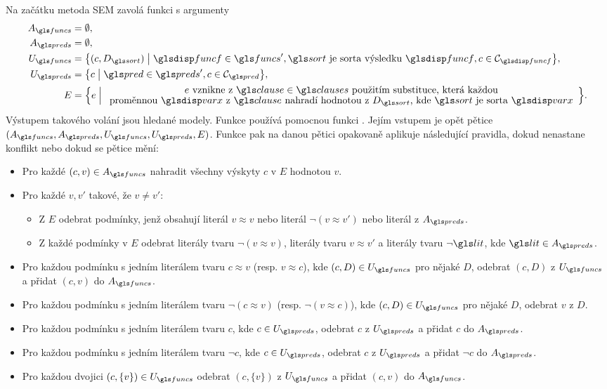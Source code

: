 Na začátku metoda SEM zavolá funkci  s argumenty
\begin{align*}
A_\funcs &= \emptyset, \\
A_\preds &= \emptyset, \\
U_\funcs &=
  \bigl\{ (c, D_\sort) \bigm|
    \func \in \funcs',
    \sort \text{ je sorta výsledku } \func,
    c \in \cells_\func \bigr\}, \\
U_\preds &=
  \bigl\{ c \bigm|
    \pred \in \preds',
    c \in \cells_\pred \bigr\}, \\
E &=
  \Bigl\{ e \Bigm|
    \array{c}
        e \text{ vznikne z $\clause \in \clauses$ použitím substituce,
                která každou} \\[-0.3ex]
      \text{proměnnou $\var$ z $\clause$ nahradí hodnotou z $D_\sort$, kde $\sort$
            je sorta $\var$}
    \endarray
    \Bigr\}.
\end{align*}
Výstupem takového volání jsou hledané modely.
Funkce  používá pomocnou funkci .
Jejím vstupem je opět pětice
$(A_\funcs, A_\preds, U_\funcs, U_\preds, E)$.
Funkce  pak na danou pětici opakovaně
aplikuje ná\-sle\-du\-jící pravidla, dokud nenastane konflikt nebo
dokud se pětice mění:
\begin{itemize}
\item Pro každé $(c, v) \in A_\funcs$ nahradit všechny výskyty $c$ v $E$
  hodnotou $v$.
\item Pro každé $v, v'$ takové, že $v \neq v'$:
  \begin{itemize}
  \item Z $E$ odebrat podmínky, jenž obsahují literál $v \approx v$
    nebo literál $\neg (v \approx v')$ nebo literál z $A_\preds$.
  \item Z každé podmínky v $E$ odebrat literály tvaru $\neg (v \approx v)$,
    literály tvaru $v \approx v'$ a literály tvaru $\neg \lit$,
    kde $\lit \in A_\preds$.
  \end{itemize}
\item Pro každou podmínku s jedním literálem tvaru $c \approx v$
  (resp. $v \approx c$),
  kde $(c, D) \in U_\funcs$ pro nějaké $D$,
  odebrat $(c, D)$ z $U_\funcs$
  a přidat $(c, v)$ do $A_\funcs$.
\item Pro každou podmínku s jedním literálem tvaru $\neg (c \approx v)$
  (resp. $\neg (v \approx c)$),
  kde $(c, D) \in U_\funcs$ pro nějaké $D$,
  odebrat $v$ z $D$.
\item Pro každou podmínku s jedním literálem tvaru $c$,
  kde $c \in U_\preds$,
  odebrat $c$ z $U_\preds$
  a přidat $c$ do $A_\preds$.
\item Pro každou podmínku s jedním literálem tvaru $\neg c$,
  kde $c \in U_\preds$,
  odebrat $c$ z $U_\preds$
  a přidat $\neg c$ do $A_\preds$.
\item Pro každou dvojici $(c, \{ v \}) \in U_\funcs$
  odebrat $(c, \{ v \})$ z $U_\funcs$
  a přidat $(c, v)$ do $A_\funcs$.
\end{itemize}

